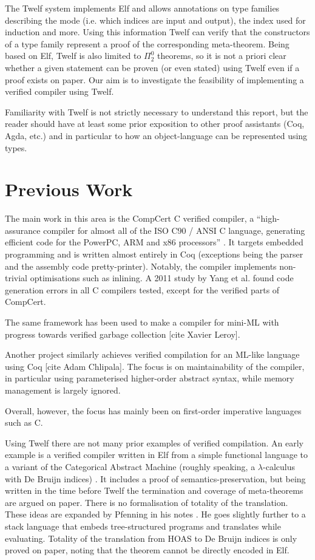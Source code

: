 The Twelf system implements Elf and allows annotations on type families describing the mode (i.e. which indices are input and output), the index used for induction and more.
Using this information Twelf can verify that the constructors of a type family represent a proof of the corresponding meta-theorem.
Being based on Elf, Twelf is also limited to $\Pi_2^0$ theorems, so it is not a priori clear whether a given statement can be proven (or even stated) using Twelf even if a proof exists on paper.
Our aim is to investigate the feasibility of implementing a verified compiler using Twelf.

Familiarity with Twelf is not strictly necessary to understand this report, but the reader should have at least some prior exposition to other proof assistants (Coq, Agda, etc.) and in particular to how an object-language can be represented using types.


\section{Previous Work}

The main work in this area is the CompCert C verified compiler, a ``high-assurance compiler for almost all of the ISO C90 / ANSI C language, generating efficient code for the PowerPC, ARM and x86 processors'' \cite{CompCert16}.
It targets embedded programming and is written almost entirely in Coq (exceptions being the parser and the assembly code pretty-printer).
Notably, the compiler implements non-trivial optimisations such as inlining.
A 2011 study by Yang et al. \cite{Yang11} found code generation errors in all C compilers tested, except for the verified parts of CompCert.

The same framework has been used to make a compiler for mini-ML with progress towards verified garbage collection [cite Xavier Leroy].

Another project similarly achieves verified compilation for an ML-like language using Coq [cite Adam Chlipala].
The focus is on maintainability of the compiler, in particular using parameterised higher-order abstract syntax, while memory management is largely ignored.

Overall, however, the focus has mainly been on first-order imperative languages such as C.

Using Twelf there are not many prior examples of verified compilation.
An early example is a verified compiler written in Elf from a simple functional language to a variant of the Categorical Abstract Machine (roughly speaking, a $\lambda$-calculus with De Bruijn indices) \cite{Hannan92}.
It includes a proof of semantics-preservation, but being written in the time before Twelf the termination and coverage of meta-theorems are argued on paper.
There is no formalisation of totality of the translation.
These ideas are expanded by Pfenning in his notes \cite[ch. 6]{Pfenning01}.
He goes slightly further to a stack language that embeds tree-structured programs and translates while evaluating.
Totality of the translation from HOAS to De Bruijn indices is only proved on paper, noting that the theorem cannot be directly encoded in Elf.


